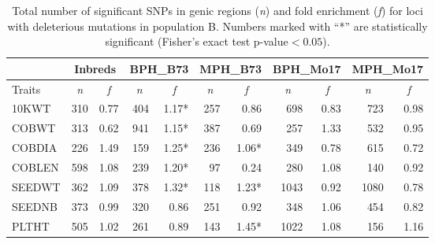 \documentclass[12pt]{article}
\begin{document}
\begin{table}[ht]
  \begin{center}
    \caption[]{Total number of significant SNPs in genic regions (\emph{n}) and fold enrichment (\emph{f}) for loci with deleterious mutations in population B. Numbers marked with ``*'' are statistically significant (Fisher's exact test p-value$<0.05$).}
{\fontsize{10}{10}\sf
      \begin{tabular}{l|rr|rr|rr|rr|rr} 
\toprule
\multicolumn{1}{c}{}	&	\multicolumn{2}{c}{Inbreds}	&	\multicolumn{2}{c}{BPH\_B73}	&	\multicolumn{2}{c}{MPH\_B73}	&	\multicolumn{2}{c}{BPH\_Mo17}	&	\multicolumn{2}{c}{MPH\_Mo17}	\\	\hline 
Traits	& 	\multicolumn{1}{c}{\emph{n}} 	& 	\multicolumn{1}{c|}{\emph{f}} 	& 	\multicolumn{1}{c}{\emph{n}} 	& 	\multicolumn{1}{c|}{\emph{f}} 	& 	\multicolumn{1}{c}{\emph{n}} 	& 	\multicolumn{1}{c|}{\emph{f}}	& 	\multicolumn{1}{c}{\emph{n}} 	& 	\multicolumn{1}{c|}{\emph{f}} 	& 	\multicolumn{1}{c}{\emph{n}} 	& 	\multicolumn{1}{c}{\emph{f}}	\\	\hline \hline 
10KWT 	& 	310 	& 	0.77 	& 	404 	& 	1.17* 	& 	257 	& 	0.86 	& 	698 	& 	0.83 	& 	723 	& 	0.98	\\
COBWT 	& 	313 	& 	0.62 	& 	941 	& 	1.15* 	& 	387 	& 	0.69 	& 	257 	& 	1.33 	& 	532 	& 	0.95	\\
COBDIA 	& 	226 	& 	1.49 	& 	159 	& 	1.25* 	& 	236 	& 	1.06* 	& 	349 	& 	0.78 	& 	615 	& 	0.72	\\
COBLEN 	& 	598 	& 	1.08 	& 	239 	& 	1.20* 	& 	97 	& 	0.24 	& 	280 	& 	1.08 	& 	140 	& 	0.92	\\
SEEDWT 	& 	362 	& 	1.09 	& 	378 	& 	1.32* 	& 	118 	& 	1.23* 	& 	1043 	& 	0.92 	& 	1080 	& 	0.78	\\
SEEDNB 	& 	373 	& 	0.99 	& 	320 	& 	0.86 	& 	251 	& 	0.92 	& 	348 	& 	1.06 	& 	454 	& 	0.82	\\
PLTHT 	& 	505 	& 	1.02 	& 	261 	& 	0.89 	& 	143 	& 	1.45* 	& 	1022 	& 	1.08 	& 	156 	& 	1.16	\\
\bottomrule
      \end{tabular}
}
    \label{popB_sig_enrichment}  
  \end{center}
\end{table}
\end{document}
